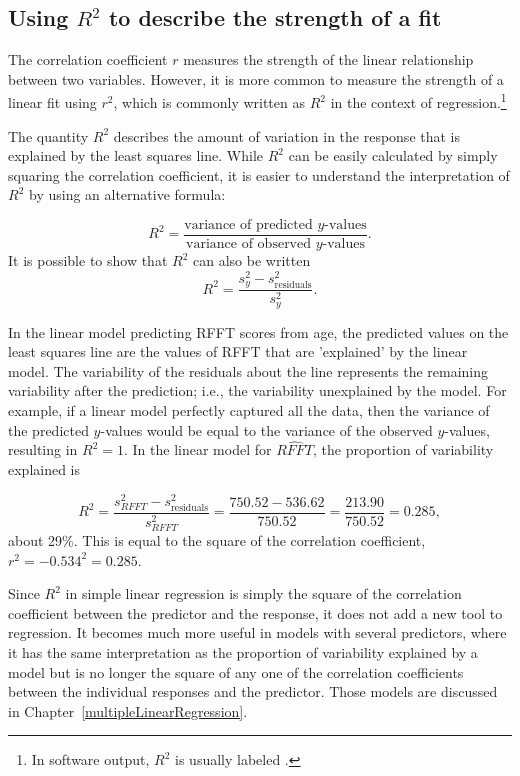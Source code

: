 

\textD{\newpage}


\subsection{Using $R^2$ to describe the strength of a fit}
\label{RSquaredLinearRegression}


The correlation coefficient $r$ measures the strength of the linear relationship between two variables. However, it is more common to measure the strength of a linear fit using $r^2$, which is commonly written as $R^2$ in the context of regression.\footnote{In software output, $R^2$ is usually labeled .} 

The quantity $R^2$ describes the amount of variation in the response that is explained by the least squares line. While $R^2$ can be easily calculated by simply squaring the correlation coefficient, it is easier to understand the interpretation of $R^2$ by using an alternative formula:

\[R^{2} = \dfrac{\text{variance of predicted $y$-values}}{\text{variance of observed $y$-values}}.\]
It is possible to show that $R^2$ can also be written
\[R^{2} = \dfrac{s^{2}_{y} - s_{\text{residuals}}^2}{s^{2}_{y}}.\]

In the linear model predicting RFFT scores from age, the predicted values on the least squares line are the values of RFFT that are 'explained' by the linear model. The variability of the residuals about the line represents the remaining variability after the prediction; i.e., the variability unexplained by the model. For example, if a linear model perfectly captured all the data, then the variance of the predicted $y$-values would be equal to the variance of the observed $y$-values, resulting in $R^2 = 1$. In the linear model for $\widehat{RFFT}$, the proportion of variability explained is

\[R^{2} = \dfrac{s^{2}_{RFFT} - s_{\text{residuals}}^2}{s^{2}_{RFFT}} = \dfrac{750.52 - 536.62}{750.52} = \dfrac{213.90}{750.52} = 0.285, \]
about 29\%. This is equal to the square of the correlation coefficient, $r^2 = -0.534^{2} = 0.285$. 

Since $R^2$ in simple linear regression is simply the square of the correlation coefficient between the predictor and the response, it does not add a new tool to regression.  It becomes much more useful in models with several predictors, where it has the same interpretation as the proportion of variability explained by a model but is no longer the square of any one of the correlation coefficients between the individual responses and the predictor.  Those models are discussed in Chapter~\ref{multipleLinearRegression}.

